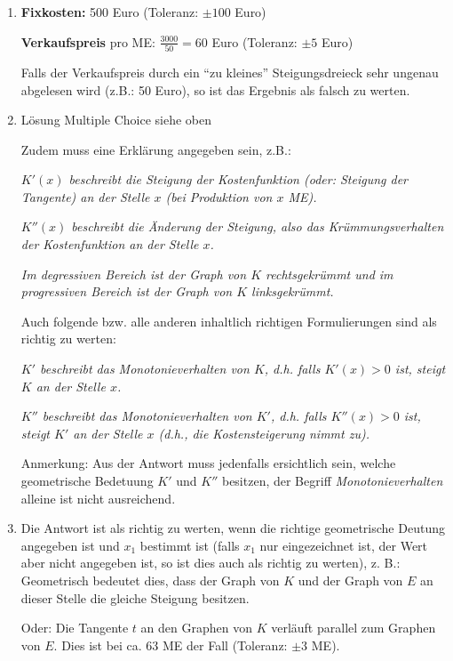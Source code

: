 \begin{langesbeispiel}
{\begin{enumerate}
	Als richtig zu werten ist auch die Antwort, dass bei einer starken Senkung des Verkaufspreises bei allen Produktionsmengen Verlust erzielt wird.
	
	\item \textbf{Fixkosten:} 500 Euro (Toleranz: $\pm 100$ Euro)
	
	\textbf{Verkaufspreis} pro ME: $\frac{3000}{50}=60$ Euro (Toleranz: $\pm 5$ Euro)
	
	Falls der Verkaufspreis durch ein "`zu kleines"' Steigungsdreieck sehr ungenau abgelesen wird (z.B.: 50 Euro), so ist das Ergebnis als falsch zu werten.
	
	\item Lösung Multiple Choice siehe oben
	
	Zudem muss eine Erklärung angegeben sein, z.B.:
	
	\textit{$K'(x)$ beschreibt die Steigung der Kostenfunktion (oder: Steigung der Tangente) an der Stelle $x$ (bei Produktion von $x$ ME).}
	
	\textit{$K''(x)$ beschreibt die Änderung der Steigung, also das Krümmungsverhalten der Kostenfunktion an der Stelle $x$.}
	
	\textit{Im degressiven Bereich ist der Graph von $K$ rechtsgekrümmt und im progressiven Bereich ist der Graph von $K$ linksgekrümmt.}
	
	Auch folgende bzw. alle anderen inhaltlich richtigen Formulierungen sind als richtig zu werten:
	
	\textit{$K'$ beschreibt das Monotonieverhalten von $K$, d.h. falls $K'(x)>0$ ist, steigt $K$ an der Stelle $x$.}
	
	\textit{$K''$ beschreibt das Monotonieverhalten von $K'$, d.h. falls $K''(x)>0$ ist, steigt $K'$ an der Stelle $x$ (d.h., die Kostensteigerung nimmt zu).}
	
	Anmerkung: Aus der Antwort muss jedenfalls ersichtlich sein, welche geometrische Bedetuung $K'$ und $K''$ besitzen, der Begriff \textit{Monotonieverhalten} alleine ist nicht ausreichend.
	
	\item Die Antwort ist als richtig zu werten, wenn die richtige geometrische Deutung angegeben ist und $x_1$ bestimmt ist (falls $x_1$ nur eingezeichnet ist, der Wert aber nicht angegeben ist, so ist dies auch als richtig zu werten), z. B.: Geometrisch bedeutet dies, dass der Graph von $K$ und der Graph von $E$ an dieser Stelle die gleiche Steigung besitzen.
	
Oder: Die Tangente $t$ an den Graphen von $K$ verläuft parallel zum Graphen von $E$.
Dies ist bei ca. 63 ME der Fall (Toleranz: $\pm 3$ ME).


\end{enumerate}}
\end{langesbeispiel}
